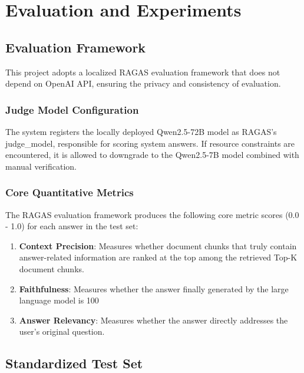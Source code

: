 \section{Evaluation and Experiments}

\subsection{Evaluation Framework}

This project adopts a localized RAGAS evaluation framework that does not depend
on OpenAI API, ensuring the privacy and consistency of evaluation.

\subsubsection{Judge Model Configuration}

The system registers the locally deployed Qwen2.5-72B model as RAGAS's
judge\_model, responsible for scoring system answers. If resource constraints
are encountered, it is allowed to downgrade to the Qwen2.5-7B model combined
with manual verification.

\subsubsection{Core Quantitative Metrics}

The RAGAS evaluation framework produces the following core metric scores (0.0 -
1.0) for each answer in the test set:

\begin{enumerate}
    \item \textbf{Context Precision}: Measures whether document chunks that truly contain answer-related information are ranked at the top among the retrieved Top-K document chunks.
    \item \textbf{Faithfulness}: Measures whether the answer finally generated by the large language model is 100%
    \item \textbf{Answer Relevancy}: Measures whether the answer directly addresses the user's original question.
\end{enumerate}

\subsection{Standardized Test Set}

